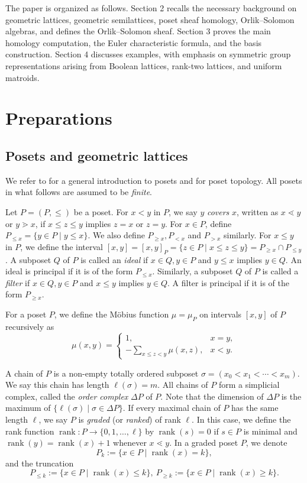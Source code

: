 \documentclass{amsart}
\numberwithin{equation}{section}
\theoremstyle{plain}
\theoremstyle{remark}
\theoremstyle{definition}
\numberwithin{equation}{section}
\DeclareMathOperator{\rank}{rank}
\begin{document}
The paper is organized as follows.  Section 2 recalls the necessary background on geometric lattices, geometric semilattices, poset sheaf homology, Orlik--Solomon algebras, and defines the Orlik--Solomon sheaf. Section 3 proves the main homology computation, the Euler characteristic formula, and the basis construction.  Section 4 discusses examples, with emphasis on symmetric group representations arising from Boolean lattices, rank-two lattices, and uniform matroids.

\section{Preparations}

\subsection{Posets and geometric lattices}
We refer to \cite{Stanley2012} for a general introduction to posets and \cite{Wachs2007} for poset topology. All posets in what follows are assumed to be {\it finite}.

Let $P=(P,\leq)$ be a poset. For $x< y$ in $P$, we say $y$ {\it covers} $x$, written as $x\lessdot y$ or $y \gtrdot x$, if $x\leq z\leq y$ implies $z=x$ or $z=y$. For $x\in P$, define $P_{\leq x}=\{y\in P\mid y\leq x\}$. We also define $P_{\geq x},P_{<x}$ and $P_{>x}$ similarly. For $x\leq y$ in $P$, we define the interval $[x,y]=[x,y]_P=\{z\in P\mid x\leq z\leq y\}=P_{\geq x}\cap P_{\leq y}$. A subposet $Q$ of $P$ is called an {\it ideal} if $x\in Q,y\in P$ and $y\leq x$ implies $y\in Q$. An ideal is principal if it is of the form $P_{\leq x}$. Similarly, a subposet $Q$ of $P$ is called a {\it filter} if $x\in Q,y\in P$ and $x\leq y$ implies $y\in Q$. A filter is principal if it is of the form $P_{\geq x}$. 

For a poset $P$, we define the M\"obius function $\mu=\mu_P$ on intervals $[x,y]$ of $P$ recursively as
\[
\mu(x,y)=\begin{cases}
    1, & x=y,\\
    -\sum_{x\leq z<y}\mu(x,z), &x<y.
\end{cases}
\]


A chain of $P$ is a non-empty totally ordered subposet $\sigma=(x_0<x_1<\cdots<x_m)$. We say this chain has length $\ell(\sigma)=m$. All chains of $P$ form a simplicial complex, called the {\it order complex} $\Delta P$ of $P$. Note that the dimension of $\Delta P$ is the maximum of $\{\ell(\sigma)\mid \sigma\in\Delta P\}$. If every maximal chain of $P$ has the same length $\ell$, we say $P$ is {\it graded} (or {\it ranked}) of rank $\ell$. In this case, we define the rank function $\rank:P\to\{0,1,\ldots,\ell\}$ by $\rank(s)=0$ if $s\in P$ is minimal and $\rank(y)=\rank(x)+1$ whenever $x\lessdot y$. In a graded poset $P$, we denote
\[
P_k:=\{x\in P\mid \rank(x)=k\},
\]
and the truncation
\[
P_{\leq k}:=\{x\in P\mid \rank(x)\leq k\}, ~P_{\geq k}:=\{x\in P\mid \rank(x)\geq k\}.
\]
\end{document}
